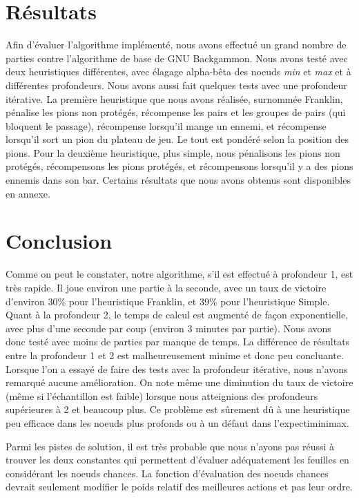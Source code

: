 \documentclass{article}
\begin{document}
\section{Résultats}
Afin d’évaluer l'algorithme implémenté, nous avons effectué un grand nombre de
parties contre l’algorithme de base de GNU Backgammon. Nous avons testé avec
deux heuristiques différentes, avec élagage alpha-bêta des noeuds \emph{min} et \emph{max} et
à différentes profondeurs. Nous avons aussi fait quelques tests avec une
profondeur itérative. La première heuristique que nous avons réalisée, surnommée
Franklin, pénalise les pions non protégés, récompense les pairs et les groupes
de pairs (qui bloquent le passage), récompense lorsqu’il mange un ennemi, et
récompense lorsqu’il sort un pion du plateau de jeu. Le tout est pondéré selon
la position des pions. Pour la deuxième heuristique, plus simple, nous
pénalisons les pions non protégés, récompensons les pions protégés, et
récompensons lorsqu’il y a des pions ennemis dans son bar. Certains résultats
que nous avons obtenus sont disponibles en annexe.

\section{Conclusion}
Comme on peut le constater, notre algorithme, s’il est effectué à profondeur 1,
est très rapide. Il joue environ une partie à la seconde, avec un taux de
victoire d’environ 30\% pour l’heuristique Franklin, et 39\% pour l’heuristique
Simple. Quant à la profondeur 2, le temps de calcul est augmenté de façon
exponentielle, avec plus d’une seconde par coup (environ 3 minutes par partie).
Nous avons donc testé avec moins de parties par manque de temps. La différence
de résultats entre la profondeur 1 et 2 est malheureusement minime et donc peu
concluante. Lorsque l’on a essayé de faire des tests avec la profondeur
itérative, nous n’avons remarqué aucune amélioration. On note même une
diminution du taux de victoire (même si l’échantillon est faible) lorsque nous
atteignions des profondeurs supérieures à 2 et beaucoup plus. Ce problème est
sûrement dû à une heuristique peu efficace dans les noeuds plus profonds ou à un
défaut dans l’expectiminimax.

Parmi les pistes de solution, il est très probable que nous n’ayons pas réussi à
trouver les deux constantes qui permettent d’évaluer adéquatement les feuilles
en considérant les noeuds chances. La fonction d’évaluation des noeuds chances
devrait seulement modifier le poids relatif des meilleures actions et pas leur
ordre.
\end{document}
